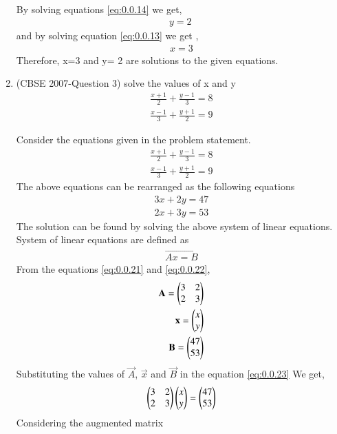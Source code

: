 \documentclass[journal,12pt,twocolumn]{IEEEtran}
\begin{document}
\begin{enumerate}
\begin{align}
\end{align}
By solving equations \eqref{eq:0.0.14} we get,
\begin{align}
y= 2\
\end{align}
and by solving equation \eqref{eq:0.0.13} we get ,
\begin{align}
x=3
\end{align}
Therefore, x=3 and y= 2 are solutions to the given equations.
\bigskip
\item (CBSE 2007-Question 3)
solve the values of x and y
\begin{align}
\displaystyle\frac{x+1}{2}+\displaystyle\frac{y-1}{3}=8\\
\displaystyle\frac{x-1}{3}+\displaystyle\frac{y+1}{2}=9\end{align}

\solution Consider the equations given in the problem statement.
\begin{align}
\displaystyle\frac{x+1}{2}+\displaystyle\frac{y-1}{3}=8\\
\displaystyle\frac{x-1}{3}+\displaystyle\frac{y+1}{2}=9
\end{align}
The above equations can be rearranged as the following equations
\begin{align}
3x+2y=47 \label{eq:0.0.21}\\
2x+3y=53 \label{eq:0.0.22}
\end{align}
The solution can be found by solving the above system of linear equations.\\ 
System of linear equations are defined as 
\begin{align}
\vec{Ax=B} \label{eq:0.0.23}
\end{align}
From the equations \eqref{eq:0.0.21} and \eqref{eq:0.0.22}, 
\begin{align}
\vec{A}= \myvec{3 &2\\2 & 3}\\
\medskip
\vec{x}= \myvec{ x\\ y}\\
\medskip
\vec{B}= \myvec{47\\53}  
\end{align} 
Substituting the values of $\vec{A}$, $\vec{x}$ and $\vec{B}$ in the equation \eqref{eq:0.0.23}
We get,
\begin{align}
\begin{pmatrix}3&2\\2&3\end{pmatrix} \begin{pmatrix}x\\y\end{pmatrix}= \begin{pmatrix}47\\53\end{pmatrix}
\end{align}
Considering the augmented matrix 

\end{enumerate}
\end{document}
